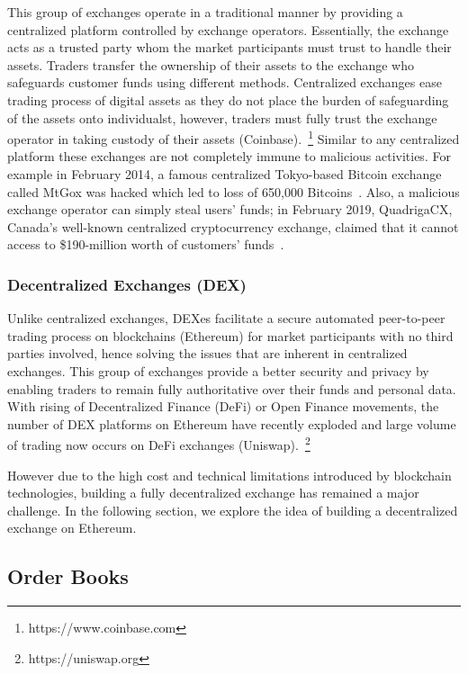 This group of exchanges operate in a traditional manner by providing a centralized platform controlled by exchange operators. Essentially, the exchange acts as a trusted party whom the market participants must trust to handle their assets. Traders transfer the ownership of their assets to the exchange who safeguards customer funds using different methods. Centralized exchanges ease trading process of digital assets as they do not place the burden of safeguarding of the assets onto individualst, however, traders must fully trust the exchange operator in taking custody of their assets (\eg Coinbase).~\footnote{https://www.coinbase.com} Similar to any centralized platform these exchanges are not completely immune to malicious activities. For example in February 2014, a famous centralized Tokyo-based Bitcoin exchange called MtGox was hacked which led to loss of 650,000 Bitcoins~\cite{TheHisto45:online}. Also, a malicious exchange operator can simply steal users' funds; in February 2019, QuadrigaCX, Canada’s well-known centralized cryptocurrency exchange, claimed that it cannot access to \$190-million worth of customers’ funds~\cite{SEBIOrde83:online}.


\subsubsection{Decentralized Exchanges (DEX)}

Unlike centralized exchanges, DEXes facilitate a secure automated peer-to-peer trading process on blockchains (\eg Ethereum) for market participants with no third parties involved, hence solving the issues that are inherent in centralized exchanges. This group of exchanges provide a better security and privacy by enabling traders to remain fully authoritative over their funds and personal data. With rising of Decentralized Finance (DeFi) or Open Finance movements, the number of DEX platforms on Ethereum have recently exploded and large volume of trading now occurs on DeFi exchanges (\eg Uniswap).~\footnote{https://uniswap.org}


However due to the high cost and technical limitations introduced by blockchain technologies, building a fully decentralized exchange has remained a major challenge. In the following section, we explore the idea of building a decentralized exchange on Ethereum.



\subsection{Order Books}

